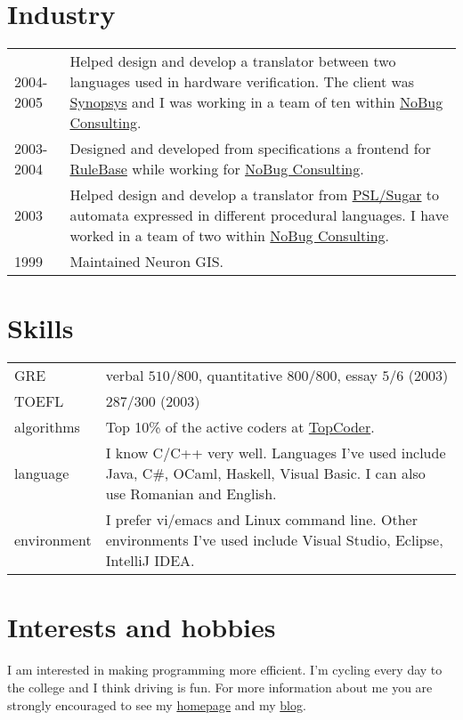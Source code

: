 \documentclass{article}
\newcommand{\nobug}{\href{http://www.nobug.com/}{NoBug Consulting}}
\newcommand{\google}[1]
{\href{http://www.google.com/search?q=#1\&btnI=I'm+feeling+lucky}{#1}}
\begin{document}
\section*{Industry}

\begin{supertabular}{lp{125mm}}

  2004-2005& Helped design and develop a translator between two
  languages used in hardware verification. The client was
  \href{http://www.synopsys.com/}{Synopsys} and I was working in a
  team of ten within \nobug. \\

  2003-2004& Designed and developed from specifications a frontend for
  \href{http://www.haifa.ibm.com/projects/verification/RB_Homepage/index.html}
  {RuleBase} while working for \nobug.  \\

  2003& Helped design and develop a translator from \google{PSL/Sugar}
  to automata expressed in different procedural languages. I have worked
  in a team of two within \nobug.\\

  1999& Maintained Neuron GIS. \\

\end{supertabular}

\clearpage

\section*{Skills}

\begin{supertabular}{lp{120mm}}
  GRE& verbal $510/800$, quantitative $800/800$, essay $5/6$ (2003) \\

  TOEFL& $287/300$ (2003) \\

  algorithms& Top 10\% of the active coders at \google{TopCoder}. \\

  language& I know C/C++ very well. Languages I've used include
  Java, C\#, OCaml, Haskell, Visual Basic. I can also use Romanian and
  English. \\

  environment& I prefer vi/emacs and Linux command line. Other
  environments I've used include Visual Studio, Eclipse, IntelliJ IDEA. \\

\end{supertabular}

\section*{Interests and hobbies}

I am interested in making programming more efficient. I'm cycling
every day to the college and I think driving is fun. For more
information about me you are strongly encouraged to see my
\href{http://rgrig.idilis.ro}{homepage} and my
\href{http://rgrig.blogspot.com}{blog}.
\end{document}
